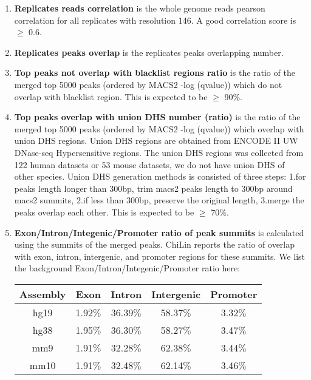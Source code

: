 \documentclass[9pt]{article}
\begin{document}
\begin{enumerate}
 \item{\textbf{Replicates reads correlation} is the whole genome reads pearson correlation for all replicates with resolution 146. A good correlation score is $\geq$ 0.6.}
 \item{\textbf{Replicates peaks overlap} is the replicates peaks overlapping number.}

 \item{\textbf{Top peaks not overlap with blacklist regions ratio} is the ratio of the merged top 5000 peaks (ordered by MACS2 -log (qvalue)) which do not overlap with blacklist region\cite{Velcro}. This is expected to be $\geq$ 90$\%$.}
   
 \item{\textbf{Top peaks overlap with union DHS number (ratio)} is the ratio of the merged top 5000 peaks (ordered by MACS2 -log (qvalue)) which overlap with union DHS regions. Union DHS regions are obtained from ENCODE II UW DNase-seq Hypersensitive regions. The union DHS regions was collected from 122 human datasets or 53 mouse datasets, we do not have union DHS of other species. Union DHS generation methods is consisted of three steps: 1.for peaks length longer than 300bp, trim macs2 peaks length to 300bp around macs2 summits, 2.if less than 300bp, preserve the original length, 3.merge the peaks overlap each other. This is expected to be $\geq$ 70$\%$.}

 \item{\textbf{Exon/Intron/Integenic/Promoter ratio of peak summits} is calculated using the summits of the merged peaks. ChiLin reports the ratio of overlap with exon, intron, intergenic, and promoter regions for these summits.\newline}
   We list the background Exon/Intron/Integenic/Promoter ratio here: \newline
   \begin{center}
   \begin{tabular}{ccccc}
     \toprule
     Assembly & Exon & Intron & Intergenic & Promoter \\
     \midrule
     hg19 & 1.92$\%$ & 36.39$\%$ & 58.37$\%$ & 3.32$\%$ \\
     \midrule
     hg38 & 1.95$\%$ & 36.30$\%$ & 58.27$\%$ & 3.47$\%$ \\
     \midrule
     mm9 & 1.91$\%$ & 32.28$\%$ & 62.38$\%$ & 3.44$\%$ \\
     \midrule
     mm10 & 1.91$\%$ & 32.48$\%$ & 62.14$\%$ & 3.46$\%$ \\
     \bottomrule
   \end{tabular}
   \end{center}


\end{enumerate}
\end{document}
